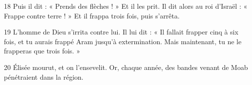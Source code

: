 
18 Puis il dit : « Prends des flèches ! » Et il les prit. Il dit alors au roi d’Israël : « Frappe contre terre ! » Et il frappa trois fois, puis s’arrêta.

19 L’homme de Dieu s’irrita contre lui. Il lui dit : « Il fallait frapper cinq à six fois, et tu aurais frappé Aram jusqu’à extermination. Mais maintenant, tu ne le frapperas que trois fois. »

20 Élisée mourut, et on l’ensevelit. Or, chaque année, des bandes venant de Moab pénétraient dans la région.
